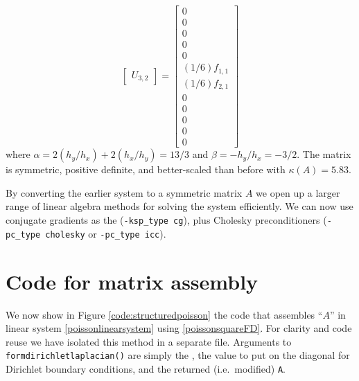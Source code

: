 \begin{example}
\begin{equation*}
\begin{bmatrix}
U_{3,2}
\end{bmatrix}
=
\begin{bmatrix}
0 \\
0 \\
0 \\
0 \\
0 \\
(1/6) f_{1,1} \\
(1/6) f_{2,1} \\
0 \\
0 \\
0 \\
0 \\
0
\end{bmatrix}
\end{equation*}
where $\alpha = 2 (h_y/h_x) + 2 (h_x/h_y) = 13/3$ and $\beta = - h_y/h_x = - 3/2$.  The matrix is symmetric, positive definite, and better-scaled than before with $\kappa(A)=5.83$.
\noindent\hrulefill
\end{example}

By converting the earlier system to a symmetric matrix $A$ we open up a larger range of linear algebra methods for solving the system efficiently.  We can now use conjugate gradients as the \pKSP (\texttt{-ksp\_type cg}), plus Cholesky preconditioners (\texttt{-pc\_type cholesky} or \texttt{-pc\_type icc}).


\section{Code for matrix assembly}

We now show in Figure \ref{code:structuredpoisson} the code that assembles ``$A$'' in linear system \eqref{poissonlinearsystem} using \eqref{poissonsquareFD}.  For clarity and code reuse we have isolated this method in a separate file.  Arguments to \texttt{formdirichletlaplacian()} are simply the \pDM, the value to put on the diagonal for Dirichlet boundary conditions, and the returned (i.e.~modified) \pMat \texttt{A}.


